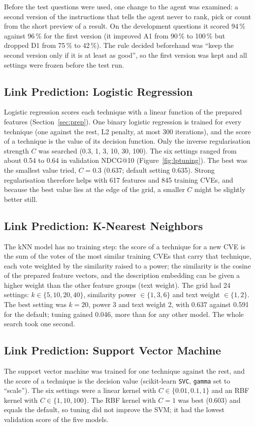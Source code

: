 \documentclass[12pt, a4paper]{article}
\begin{document}
Before the test questions were used, one change to the agent was examined: a second version of the instructions that tells the agent never to rank, pick or count from the short preview of a result. On the development questions it scored 94\,\% against 96\,\% for the first version (it improved A1 from 90\,\% to 100\,\% but dropped D1 from 75\,\% to 42\,\%). The rule decided beforehand was ``keep the second version only if it is at least as good'', so the first version was kept and all settings were frozen before the test run.
\subsection{Link Prediction: Logistic Regression}
Logistic regression scores each technique with a linear function of the prepared features (Section~\ref{sec:prep}). One binary logistic regression is trained for every technique (one against the rest, L2 penalty, at most 300 iterations), and the score of a technique is the value of its decision function. Only the inverse regularisation strength $C$ was searched (0.3, 1, 3, 10, 30, 100). The six settings ranged from about 0.54 to 0.64 in validation NDCG@10 (Figure~\ref{fig:lptuning}). The best was the smallest value tried, $C=0.3$ (0.637; default setting 0.635). Strong regularisation therefore helps with 617 features and 845 training CVEs, and because the best value lies at the edge of the grid, a smaller $C$ might be slightly better still.
\subsection{Link Prediction: K-Nearest Neighbors}
The kNN model has no training step: the score of a technique for a new CVE is the sum of the votes of the most similar training CVEs that carry that technique, each vote weighted by the similarity raised to a power; the similarity is the cosine of the prepared feature vectors, and the description embedding can be given a higher weight than the other feature groups (text weight). The grid had 24 settings: $k\in\{5,10,20,40\}$, similarity power $\in\{1,3,6\}$ and text weight $\in\{1,2\}$. The best setting was $k=20$, power 3 and text weight 2, with 0.637 against 0.591 for the default; tuning gained 0.046, more than for any other model. The whole search took one second.
\subsection{Link Prediction: Support Vector Machine}
The support vector machine was trained for one technique against the rest, and the score of a technique is the decision value (scikit-learn \texttt{SVC}, \texttt{gamma} set to ``scale''). The six settings were a linear kernel with $C\in\{0.01,0.1,1\}$ and an RBF kernel with $C\in\{1,10,100\}$. The RBF kernel with $C=1$ was best (0.603) and equals the default, so tuning did not improve the SVM; it had the lowest validation score of the five models.
\end{document}
